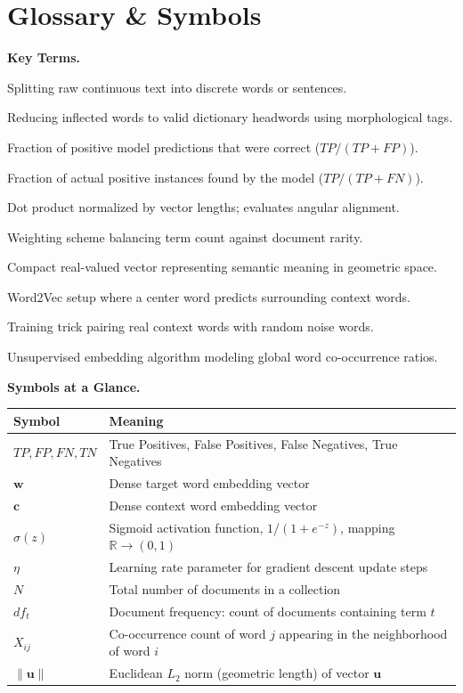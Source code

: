 \documentclass[a4paper,11pt]{article}
\begin{document}
\newpage
\section*{Glossary \& Symbols}

\noindent\textbf{Key Terms.}
\begin{description}[leftmargin=8.5em,style=nextline,font=\normalfont\bfseries\color{accent}]
  \item[Tokenization] Splitting raw continuous text into discrete words or sentences.
  \item[Lemmatization] Reducing inflected words to valid dictionary headwords using morphological tags.
  \item[Precision] Fraction of positive model predictions that were correct ($TP / (TP + FP)$).
  \item[Recall] Fraction of actual positive instances found by the model ($TP / (TP + FN)$).
  \item[Cosine Similarity] Dot product normalized by vector lengths; evaluates angular alignment.
  \item[TF-IDF] Weighting scheme balancing term count against document rarity.
  \item[Embedding] Compact real-valued vector representing semantic meaning in geometric space.
  \item[Skip-gram] Word2Vec setup where a center word predicts surrounding context words.
  \item[Negative Sampling] Training trick pairing real context words with random noise words.
  \item[GloVe] Unsupervised embedding algorithm modeling global word co-occurrence ratios.
\end{description}

\medskip
\noindent\textbf{Symbols at a Glance.}
\begin{center}\small
\begin{tabular}{@{}ll@{}}
\toprule
\textbf{Symbol} & \textbf{Meaning} \\
\midrule
$TP, FP, FN, TN$ & True Positives, False Positives, False Negatives, True Negatives \\
$\mathbf{w}$ & Dense target word embedding vector \\
$\mathbf{c}$ & Dense context word embedding vector \\
$\sigma(z)$ & Sigmoid activation function, $1 / (1 + e^{-z})$, mapping $\mathbb{R} \rightarrow (0, 1)$ \\
$\eta$ & Learning rate parameter for gradient descent update steps \\
$N$ & Total number of documents in a collection \\
$df_t$ & Document frequency: count of documents containing term $t$ \\
$X_{ij}$ & Co-occurrence count of word $j$ appearing in the neighborhood of word $i$ \\
$\|\mathbf{u}\|$ & Euclidean $L_2$ norm (geometric length) of vector $\mathbf{u}$ \\
\bottomrule
\end{tabular}
\end{center}
\end{document}
